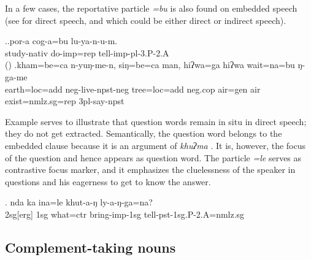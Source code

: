In a few cases, the reportative particle \emph{=bu} is also found on embedded speech (see \Next[a] for direct speech, and \Next[b] which could be either direct or indirect speech). 

\ex.\ag.por-a        cog-a=bu         lu-ya-n-u-m.\\
study{\sc -nativ} do{\sc -imp=rep} tell{\sc -imp-pl-3.P-2.A}\\
 () 
\bg.kham=be=ca             n-yuŋ-me-n,                    siŋ=be=ca           man,     hiʔwa=ga    hiʔwa wait=na=bu            ŋ-ga-me\\
earth{\sc =loc=add} {\sc neg-}live{\sc [3sg]-npst-neg} tree{\sc =loc=add} {\sc neg.cop} air{\sc =gen} air exist{\sc [npst;3]=nmlz.sg=rep} {\sc 3pl-}say{\sc -npst}\\


Example \Next serves to illustrate that question words remain in situ in direct speech; they do not get extracted. Semantically, the question word belongs to the embedded clause because it is an argument of \emph{khuʔma} . It is, however, the focus of the question and hence appears as question word. The particle \emph{=le} serves as contrastive focus marker, and it emphasizes the cluelessness of the speaker  in questions and his eagerness to get to know the answer.

\exg. nda ka ina=le khut-a-ŋ ly-a-ŋ-ga=na?\\
		{\sc 2sg[erg]} {\sc 1sg} what{\sc =ctr}	bring{\sc -imp-1sg} tell{\sc -pst-1sg.P-2.A=nmlz.sg}\\







\subsection{Complement-taking nouns}\label{noun-compl}

